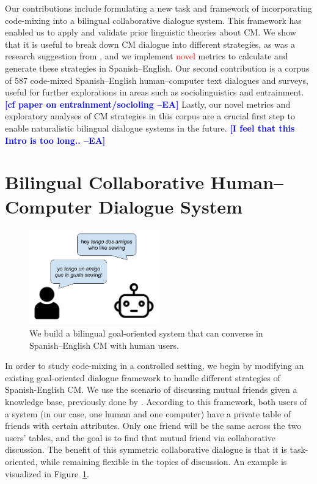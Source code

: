 \documentclass[11pt,a4paper]{article}
\newcommand{\ea}[1]{\textcolor{blue}{\bf\small [#1 --EA]}}
\newcommand{\yt}[1]{\textcolor{cyan}{\bf\small [#1 --YT]}}
\newcommand{\red}[1]{\textcolor{red}{#1}}
\newcommand{\Fref}[1]{Figure~\ref{#1}}
\begin{document}
Our contributions include formulating a new task and framework of incorporating code-mixing into a bilingual collaborative dialogue system.
This framework has enabled us to apply and validate prior linguistic theories about CM.
We show that it is useful to break down CM dialogue into different strategies, as was a research suggestion from \citep{bullock2018should}, and we implement \red{novel} metrics to calculate and generate these strategies in Spanish--English.
Our second contribution is a corpus of 587 code-mixed Spanish--English human--computer text dialogues and surveys, useful for further explorations in areas such as sociolinguistics and entrainment.
\ea{cf paper on entrainment/socioling}
Lastly, our novel metrics and exploratory analyses of CM strategies in this corpus are a crucial first step to enable naturalistic bilingual dialogue systems in the future. %
\ea{I feel that this Intro is too long..}


\section{Bilingual Collaborative Human--Computer Dialogue System}
\label{sec:dialogue-system}

\begin{figure}
	\includegraphics[width=0.5\textwidth]{img/ex_chat_1030}
	\centering
  	\caption{We build a bilingual goal-oriented system that can converse in Spanish--English CM with human users.}
    \label{fig:human-comp-chat}
\end{figure}

In order to study code-mixing in a controlled setting, we begin by modifying an existing goal-oriented dialogue framework to handle different strategies of Spanish-English CM.
We use the scenario of discussing mutual friends given a knowledge base, previously done by \citet{He2017}. 
According to this framework, both users of a system (in our case, one human and one computer) have a private table of friends with certain attributes. 
Only one friend will be the same across the two users' tables, and the goal is to find that mutual friend via collaborative discussion. 
The benefit of this symmetric collaborative dialogue is that it is task-oriented, while remaining flexible in the topics of discussion.
An example is visualized in \Fref{fig:human-comp-chat}.
\end{document}
